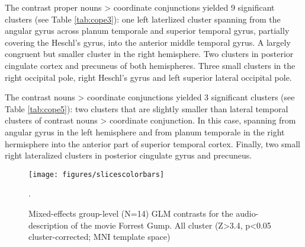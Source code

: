 \documentclass[10pt,a4paper,onecolumn]{article}
\begin{document}
The contrast proper nouns > coordinate conjunctions yielded 9 significant clusters (see Table \ref{tab:cope3}):
one left laterlized cluster spanning from the angular gyrus across planum temporale and superior temporal gyrus, partially covering the Heschl's gyrus, into the anterior middle temporal gyrus.
A largely congruent but smaller cluster in the right hemisphere.
Two clusters in posterior cingulate cortex and precuneus of both hemispheres.
Three small clusters in the right occipital pole, right Heschl's gyrus and left superior lateral occipital pole.

The contrast nouns > coordinate conjunctions yielded 3 significant clusters (see Table \ref{tab:cope5}):
two clusters that are slightly smaller than lateral temporal clusters of contrast nouns > coordinate conjunction. In this case, spanning from angular gyrus in the left hemisphere and from planum temporale in the right hermisphere into the anterior part of superior temporal cortex.
Finally, two small right lateralized clusters in posterior cingulate gyrus and precuneus.

\begin{figure*}
  \centering
  \texttt{[image: figures/slicescolorbars]}
  \caption{Mixed-effects group-level (N=14) GLM contrasts for the audio-description of the movie Forrest Gump. All cluster (Z>3.4, p<0.05 cluster-corrected; MNI template space)}.
\label{fig:results}
\end{figure*}
\end{document}
